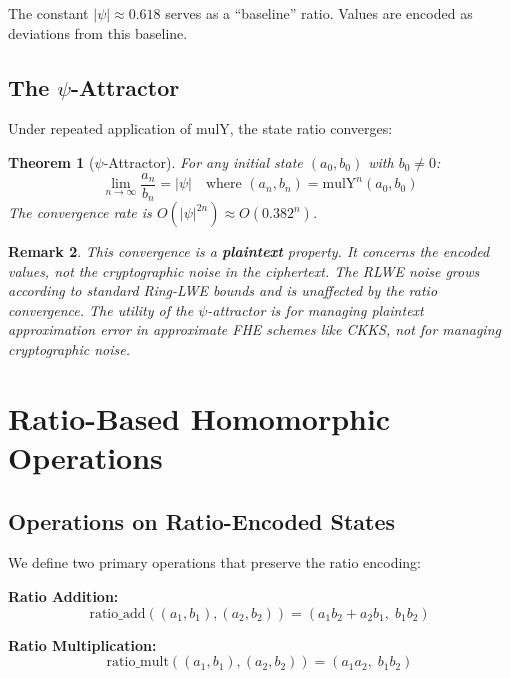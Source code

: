 \documentclass[11pt,a4paper]{article}
\newtheorem{theorem}{Theorem}[section]
\newtheorem{remark}[theorem]{Remark}
\begin{document}
The constant $|\psi| \approx 0.618$ serves as a ``baseline'' ratio. Values are encoded as deviations from this baseline.

\subsection{The $\psi$-Attractor}

Under repeated application of $\text{mulY}$, the state ratio converges:

\begin{theorem}[$\psi$-Attractor]
For any initial state $(a_0, b_0)$ with $b_0 \neq 0$:
\begin{equation}
\lim_{n\to\infty} \frac{a_n}{b_n} = |\psi| \quad \text{where } (a_n, b_n) = \text{mulY}^n(a_0, b_0)
\end{equation}
The convergence rate is $O(|\psi|^{2n}) \approx O(0.382^n)$.
\end{theorem}

\begin{remark}
This convergence is a \textbf{plaintext} property. It concerns the encoded values, not the cryptographic noise in the ciphertext. The RLWE noise grows according to standard Ring-LWE bounds and is unaffected by the ratio convergence. The utility of the $\psi$-attractor is for managing \textit{plaintext approximation error} in approximate FHE schemes like CKKS, not for managing \textit{cryptographic noise}.
\end{remark}

\section{Ratio-Based Homomorphic Operations}

\subsection{Operations on Ratio-Encoded States}

We define two primary operations that preserve the ratio encoding:

\textbf{Ratio Addition:}
\begin{equation}
\text{ratio\_add}((a_1,b_1), (a_2,b_2)) = (a_1b_2 + a_2b_1,\; b_1b_2)
\end{equation}

\textbf{Ratio Multiplication:}
\begin{equation}
\text{ratio\_mult}((a_1,b_1), (a_2,b_2)) = (a_1a_2,\; b_1b_2)
\end{equation}
\end{document}
